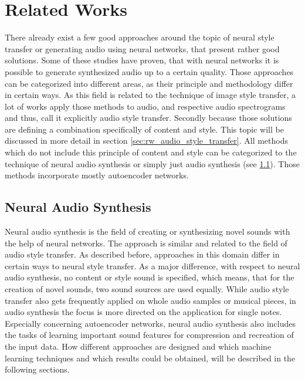 \chapter{Related Works}
\label{cha:related_works}

There already exist a few good approaches around the topic of neural style transfer or generating audio using neural networks, that present rather good solutions. Some of these studies have proven, that with neural networks it is possible to generate synthesized audio up to a certain quality. Those approaches can be categorized into different areas, as their principle and methodology differ in certain ways. As this field is related to the technique of image style transfer, a lot of works apply those methods to audio, and respective audio spectrograms and thus, call it explicitly audio style transfer. Secondly because those solutions are defining a combination specifically of content and style. This topic will be discussed in more detail in section \ref{sec:rw_audio_style_transfer}. All methods which do not include this principle of content and style can be categorized to the technique of neural audio synthesis or simply just audio synthesis (see \ref{sec:rw_neural_audio_synthesis}). Those methods incorporate mostly autoencoder networks. 

\section{Neural Audio Synthesis}
\label{sec:rw_neural_audio_synthesis}
Neural audio synthesis is the field of creating or synthesizing novel sounds with the help of neural networks. The approach is similar and related to the field of audio style transfer. As described before, approaches in this domain differ in certain ways to neural style transfer. As a major difference, with respect to neural audio synthesis, no content or style sound is specified, which means, that for the creation of novel sounds, two sound sources are used equally. While audio style transfer also gets frequently applied on whole audio samples or musical pieces, in audio synthesis the focus is more directed on the application for single notes. Especially concerning autoencoder networks, neural audio synthesis also includes the tasks of learning important sound features for compression and recreation of the input data. How different approaches are designed and which machine learning techniques and which results could be obtained, will be described in the following sections.

